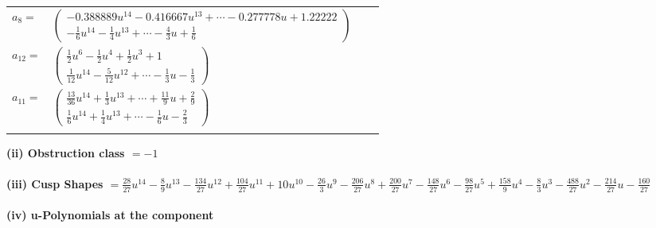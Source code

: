 \documentclass[1p]{elsarticle_modified}
\theoremstyle{definition}
\begin{document}
\begin{tabular}{m{7pt} m{180pt} m{7pt} m{180pt} }
\flushright $a_{8}=$&$\begin{pmatrix}-0.388889 u^{14}-0.416667 u^{13}+\cdots-0.277778 u+1.22222\\-\frac{1}{6} u^{14}-\frac{1}{4} u^{13}+\cdots-\frac{4}{3} u+\frac{1}{6}\end{pmatrix}$ \\
\flushright $a_{12}=$&$\begin{pmatrix}\frac{1}{2} u^6-\frac{1}{2} u^4+\frac{1}{2} u^3+1\\\frac{1}{12} u^{14}-\frac{5}{12} u^{12}+\cdots-\frac{1}{3} u-\frac{1}{3}\end{pmatrix}$ \\
\flushright $a_{11}=$&$\begin{pmatrix}\frac{13}{36} u^{14}+\frac{1}{3} u^{13}+\cdots+\frac{11}{9} u+\frac{2}{9}\\\frac{1}{6} u^{14}+\frac{1}{4} u^{13}+\cdots-\frac{1}{6} u-\frac{2}{3}\end{pmatrix}$\\&\end{tabular}
\flushleft \textbf{(ii) Obstruction class $= -1$}\\~\\
\flushleft \textbf{(iii) Cusp Shapes $= \frac{28}{27} u^{14}-\frac{8}{9} u^{13}-\frac{134}{27} u^{12}+\frac{104}{27} u^{11}+10 u^{10}-\frac{26}{3} u^9-\frac{206}{27} u^8+\frac{200}{27} u^7-\frac{148}{27} u^6-\frac{98}{27} u^5+\frac{158}{9} u^4-\frac{8}{3} u^3-\frac{488}{27} u^2-\frac{214}{27} u-\frac{160}{27}$}\\~\\
\newpage\renewcommand{\arraystretch}{1}
\flushleft \textbf{(iv) u-Polynomials at the component}\newline \\
\end{document}
